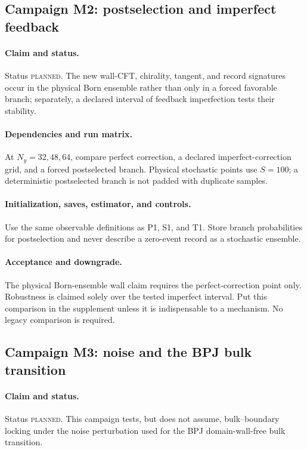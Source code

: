 \documentclass[aps,prx,onecolumn,nofootinbib,superscriptaddress,longbibliography]{revtex4-2}
\newcommand{\planned}{\textsc{planned}}
\begin{document}
\subsection{Campaign M2: postselection and imperfect feedback}
\paragraph{Claim and status.}
Status \planned.  The new wall-CFT, chirality, tangent, and record signatures occur in the
physical Born ensemble rather than only in a forced favorable branch; separately, a
declared interval of feedback imperfection tests their stability.

\paragraph{Dependencies and run matrix.}
At $N_y=32,48,64$, compare perfect correction, a declared imperfect-correction grid, and a
forced postselected branch.  Physical stochastic points use $S=100$; a deterministic
postselected branch is not padded with duplicate samples.

\paragraph{Initialization, saves, estimator, and controls.}
Use the same observable definitions as P1, S1, and T1.  Store branch probabilities for
postselection and never describe a zero-event record as a stochastic ensemble.

\paragraph{Acceptance and downgrade.}
The physical Born-ensemble wall claim requires the perfect-correction point only.  Robustness is
claimed solely over the tested imperfect interval.  Put this comparison in the supplement
unless it is indispensable to a mechanism.  No legacy comparison is required.

\subsection{Campaign M3: noise and the BPJ bulk transition}
\paragraph{Claim and status.}
Status \planned.  This campaign tests, but does not assume, bulk--boundary locking under the
noise perturbation used for the BPJ domain-wall-free bulk transition.
\end{document}
